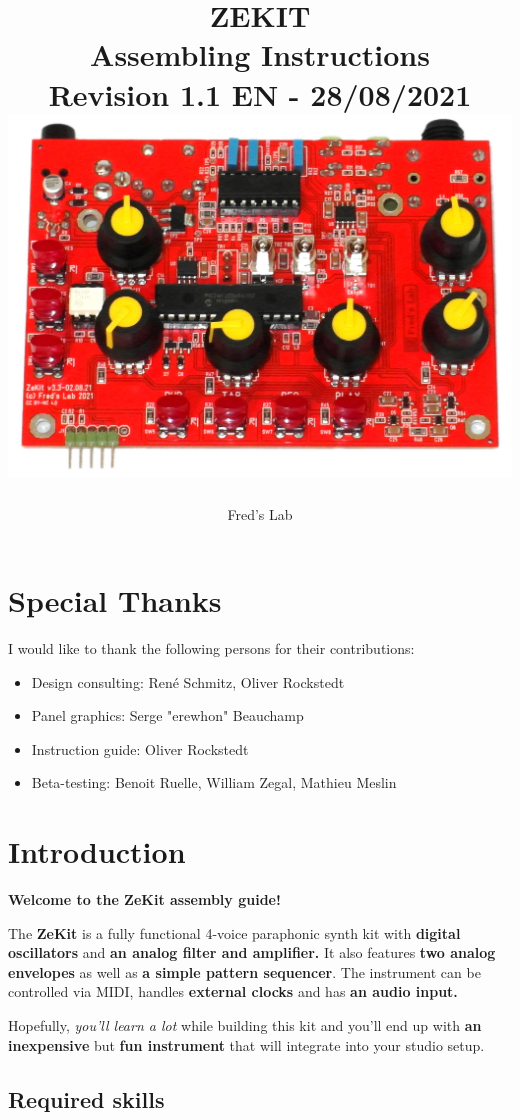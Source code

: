 \documentclass{scrartcl}
\title{
    \vspace*{4cm}
    \huge{ZEKIT} \\
    Assembling Instructions \\
    \vspace*{0.25cm}
    \small{Revision 1.1 EN - 28/08/2021} \\
    \vspace*{0.5cm}
    \includegraphics[scale=0.2]{assets/zekit-assembled.jpg}
}
\author{Fred's Lab}
\begin{document}
\maketitle

\pagebreak


\tableofcontents
\pagebreak


\section{Special Thanks}

I would like to thank the following persons for their contributions:

\begin{itemize}
    \item Design consulting: René Schmitz, Oliver Rockstedt
    \item Panel graphics: Serge "erewhon" Beauchamp
    \item Instruction guide: Oliver Rockstedt
    \item Beta-testing: Benoit Ruelle, William Zegal, Mathieu Meslin
\end{itemize}


\section{Introduction}

\textbf{Welcome to the ZeKit assembly guide!}

The \textbf{ZeKit} is a fully functional 4-voice paraphonic synth kit with \textbf{digital oscillators} and \textbf{an analog filter and amplifier.}
It also features \textbf{two analog envelopes} as well as \textbf{a simple pattern sequencer}.
The instrument can be controlled via MIDI, handles \textbf{external clocks} and has \textbf{an audio input.}

Hopefully, \emph{you'll learn a lot} while building this kit and you'll end up with \textbf{an inexpensive} but \textbf{fun instrument} that will integrate into your studio setup.

\subsection{Required skills}
\end{document}
